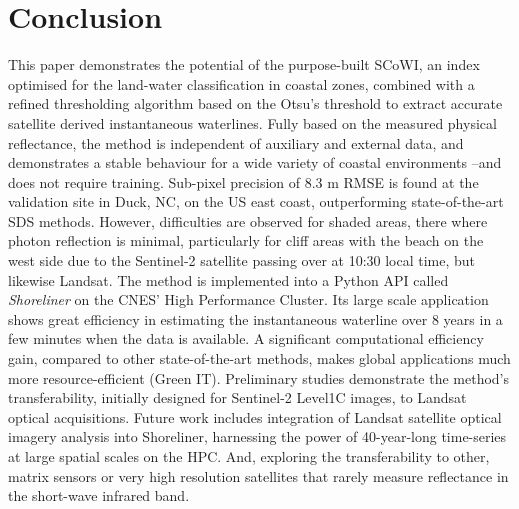 \documentclass[remotesensing,technicalnote,submit,pdftex,moreauthors]{Definitions/mdpi}
\begin{document}
\section{Conclusion}
This paper demonstrates the potential of the purpose-built SCoWI, an index optimised for the land-water classification in coastal zones, combined with a refined thresholding algorithm based on the Otsu's threshold to extract accurate satellite derived instantaneous waterlines.
Fully based on the measured physical reflectance, the method is independent of auxiliary and external data, and demonstrates a stable behaviour for a wide variety of coastal environments --and does not require training. Sub-pixel precision of 8.3 m RMSE is found at the validation site in Duck, NC, on the US east coast, outperforming state-of-the-art SDS methods. However, difficulties are observed for shaded areas, there where photon reflection is minimal, particularly for cliff areas with the beach on the west side due to the Sentinel-2 satellite passing over at 10:30 local time, but likewise Landsat. The method is implemented into a Python API called \textit{Shoreliner} on the CNES' High Performance Cluster. Its large scale application shows great efficiency in estimating the instantaneous waterline over 8 years in a few minutes when the data is available. A significant computational efficiency gain, compared to other state-of-the-art methods, makes global applications much more resource-efficient (Green IT). Preliminary studies demonstrate the method's transferability, initially designed for Sentinel-2 Level1C images, to Landsat optical acquisitions. Future work includes integration of Landsat satellite optical imagery analysis into Shoreliner, harnessing the power of 40-year-long time-series at large spatial scales on the HPC. And, exploring the transferability to other, matrix sensors or very high resolution satellites that rarely measure reflectance in the short-wave infrared band. 

\vspace{6pt} 

\end{document}
